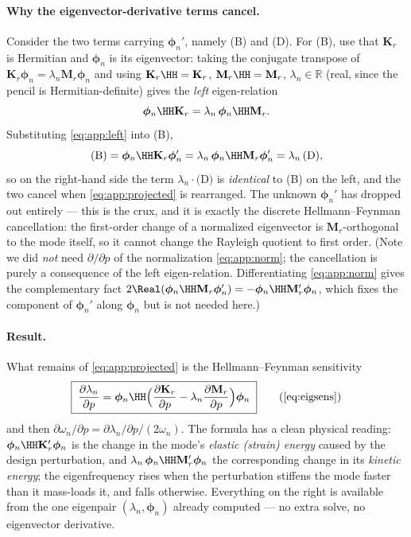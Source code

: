 \documentclass[11pt]{article}
\begin{document}
\paragraph{Why the eigenvector-derivative terms cancel.} Consider the two terms
carrying $\bm\phi_n'$, namely (B) and (D). For (B), use that $\mathbf K_r$ is
Hermitian and $\bm\phi_n$ is its eigenvector: taking the conjugate transpose of
$\mathbf K_r\bm\phi_n=\lambda_n\mathbf M_r\bm\phi_n$ and using
$\mathbf K_r\HH=\mathbf K_r$, $\mathbf M_r\HH=\mathbf M_r$, $\lambda_n\in\mathbb
R$ (real, since the pencil is Hermitian-definite) gives the \emph{left}
eigen-relation
\begin{equation}
  \bm\phi_n\HH\mathbf K_r=\lambda_n\,\bm\phi_n\HH\mathbf M_r.
  \label{eq:app:left}
\end{equation}
Substituting \eqref{eq:app:left} into (B),
\[
  \text{(B)}=\bm\phi_n\HH\mathbf K_r\bm\phi_n'
  =\lambda_n\,\bm\phi_n\HH\mathbf M_r\bm\phi_n'
  =\lambda_n\,\text{(D)},
\]
so on the right-hand side the term $\lambda_n\cdot\text{(D)}$ is \emph{identical}
to (B) on the left, and the two cancel when \eqref{eq:app:projected} is
rearranged. The unknown $\bm\phi_n'$ has dropped out entirely --- this is the
crux, and it is exactly the discrete Hellmann--Feynman cancellation: the
first-order change of a normalized eigenvector is $\mathbf M_r$-orthogonal to the
mode itself, so it cannot change the Rayleigh quotient to first order. (Note we
did \emph{not} need $\partial/\partial p$ of the normalization
\eqref{eq:app:norm}; the cancellation is purely a consequence of the left
eigen-relation. Differentiating \eqref{eq:app:norm} gives the complementary fact
$2\Real(\bm\phi_n\HH\mathbf M_r\bm\phi_n')=-\bm\phi_n\HH\mathbf M_r'\bm\phi_n$,
which fixes the component of $\bm\phi_n'$ along $\bm\phi_n$ but is not needed
here.)

\paragraph{Result.} What remains of \eqref{eq:app:projected} is the
Hellmann--Feynman sensitivity
\begin{equation}
  \boxed{\;\frac{\partial\lambda_n}{\partial p}
  =\bm\phi_n\HH\Bigl(\frac{\partial\mathbf K_r}{\partial p}
  -\lambda_n\frac{\partial\mathbf M_r}{\partial p}\Bigr)\bm\phi_n\;}
  \tag{\ref{eq:eigsens}}
\end{equation}
and then $\partial\omega_n/\partial p=\partial\lambda_n/\partial p/(2\omega_n)$.
The formula has a clean physical reading: $\bm\phi_n\HH\mathbf K_r'\bm\phi_n$ is
the change in the mode's \emph{elastic (strain) energy} caused by the design
perturbation, and $\lambda_n\,\bm\phi_n\HH\mathbf M_r'\bm\phi_n$ the corresponding
change in its \emph{kinetic energy}; the eigenfrequency rises when the
perturbation stiffens the mode faster than it mass-loads it, and falls otherwise.
Everything on the right is available from the one eigenpair $(\lambda_n,
\bm\phi_n)$ already computed --- no extra solve, no eigenvector derivative.
\end{document}

